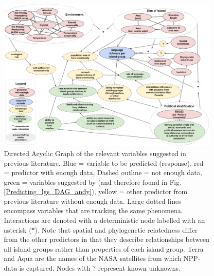 \documentclass[unnumsec,webpdf,modern,medium]{oup-authoring-template}
\providecommand{\DIFaddtex}[1]{{\protect\color{blue} \sf #1}} %
\providecommand{\DIFaddbegin}{} %
\providecommand{\DIFaddend}{} %
\providecommand{\DIFadd}[1]{\texorpdfstring{\DIFaddtex{#1}}{#1}} %
\newcommand{\DIFaddincludegraphics}[2][]{{\color{blue}\fbox{\DIFOincludegraphics[#1]{#2}}}} %
\DeclareRobustCommand{\DIFaddbegin}{\DIFOaddbegin \let\includegraphics\DIFaddincludegraphics} %
\DeclareRobustCommand{\DIFaddend}{\DIFOaddend \let\includegraphics\DIFOincludegraphics} %
\begin{document}
\DIFaddbegin \begin{figure} 
\includegraphics[width=\textwidth]{Predicting_lgs_DAG_full}
\caption{\DIFadd{Directed Acyclic Graph of the relevant variables suggested in previous literature. Blue = variable to be predicted (response), red = predictor with enough data, Dashed outline = not enough data, green = variables suggested by \citet{pawley2007} (and therefore found in Fig. \ref{Predicting_lgs_DAG_andy}), yellow = other predictor from previous literature without enough data. Large dotted lines encompass variables that are tracking the same phenomena.  Interactions are denoted with a deterministic node labelled with an asterisk ($\ast$). Note that spatial and phylogenetic relatedness differ from the other predictors in that they describe relationships between all island groups rather than properties of each island group. Terra and Aqua are the names of the NASA satellites from which NPP-data is captured. Nodes with ? represent known unknowns.}}
\label{Predicting_lgs_DAG_full}
\end{figure}
\DIFaddend 

\FloatBarrier
\DIFaddbegin 
\end{document}
